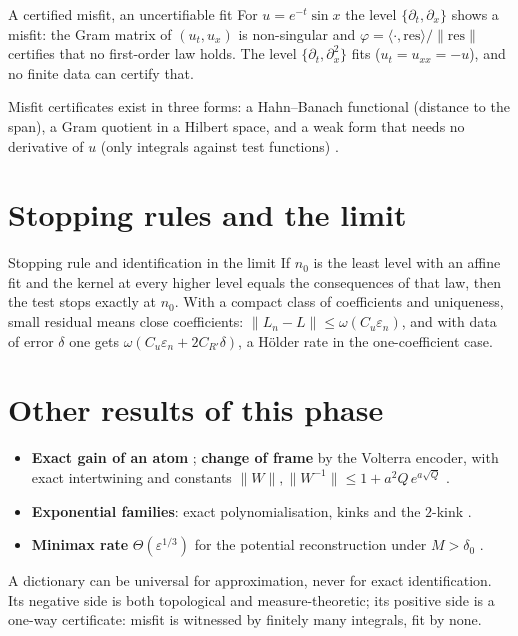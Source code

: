 \begin{example}{A certified misfit, an uncertifiable fit}
For $u=e^{-t}\sin x$ the level $\{\partial_t,\partial_x\}$ shows a misfit: the Gram matrix of $(u_t,u_x)$ is non-singular and $\varphi=\langle\cdot,\mathrm{res}\rangle/\|\mathrm{res}\|$ certifies that no first-order law holds. The level $\{\partial_t,\partial_x^2\}$ fits ($u_t=u_{xx}=-u$), and no finite data can certify that.
\end{example}

Misfit certificates exist in three forms: a Hahn--Banach functional (distance to the span), a Gram quotient in a Hilbert space, and a weak form that needs no derivative of $u$ (only integrals against test functions) .

\section{Stopping rules and the limit}

\begin{theorem}{Stopping rule and identification in the limit  \proved}\label{thm:dictgr}
If $n_0$ is the least level with an affine fit and the kernel at every higher level equals the consequences of that law, then the test stops exactly at $n_0$. With a compact class of coefficients and uniqueness, small residual means close coefficients: $\|L_n-L\|\le\omega(C_u\varepsilon_n)$, and with data of error $\delta$ one gets $\omega(C_u\varepsilon_n+2C_{R'}\delta)$, a H\"older rate in the one-coefficient case.
\end{theorem}

\section{Other results of this phase}

\begin{itemize}
\item \textbf{Exact gain of an atom} ; \textbf{change of frame} by the Volterra encoder, with exact intertwining and constants $\|W\|,\|W^{-1}\|\le1+a^2Q\,e^{a\sqrt Q}$ .
\item \textbf{Exponential families}: exact polynomialisation, kinks and the $2$-kink .
\item \textbf{Minimax rate} $\Theta(\varepsilon^{1/3})$ for the potential reconstruction under $M>\delta_0$ .
\end{itemize}

\begin{takeaway}
A dictionary can be universal for approximation, never for exact identification. Its negative side is both topological and measure-theoretic; its positive side is a one-way certificate: misfit is witnessed by finitely many integrals, fit by none.
\end{takeaway}
